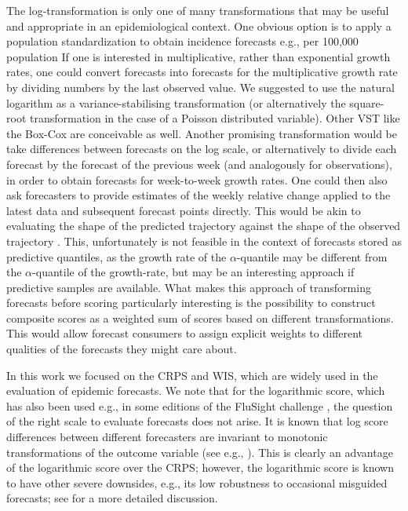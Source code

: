\documentclass{article}
\begin{document}
The log-transformation is only one of many transformations that may be useful and appropriate in an epidemiological context. One obvious option is to apply a population standardization to obtain incidence forecasts e.g., per 100,000 population If one is interested in multiplicative, rather than exponential growth rates, one could convert forecasts into forecasts for the multiplicative growth rate by dividing numbers by the last observed value. We suggested to use the natural logarithm as a variance-stabilising transformation (or alternatively the square-root transformation in the case of a Poisson distributed variable). Other VST like the Box-Cox \citep{boxAnalysisTransformations1964} are conceivable as well. Another promising transformation would be take differences between forecasts on the log scale, or alternatively
to divide each forecast by the forecast of the previous week (and analogously for observations), in order to obtain forecasts for week-to-week growth rates. One could then also ask forecasters to provide estimates of the weekly relative change applied to the latest data and subsequent forecast points directly. This would be akin to evaluating the shape of the predicted trajectory against the shape of the observed trajectory \citep[for a different approach to evaluate the shape of a forecast, see][]{srivastavaShapebasedEvaluationEpidemic2022}. This, unfortunately is not feasible in the context of forecasts stored as predictive quantiles, as the growth rate of the $\alpha$-quantile may be different from the $\alpha$-quantile of the growth-rate, but may be an interesting approach if predictive samples are available. What makes this approach of transforming forecasts before scoring particularly interesting is the possibility to construct composite scores as a weighted sum of scores based on different transformations. This would allow forecast consumers to assign explicit weights to different qualities of the forecasts they might care about.

In this work we focused on the CRPS and WIS, which are widely used in the evaluation of epidemic forecasts. We note that for the logarithmic score, which has also been used e.g., in some editions of the FluSight challenge \cite{reichCollaborativeMultiyearMultimodel2019}, the question of the right scale to evaluate forecasts does not arise. It is known that log score differences between different forecasters are invariant to monotonic transformations of the outcome variable (see e.g., \citealt{Diks2011}). This is clearly an advantage of the logarithmic score over the CRPS; however, the logarithmic score is known to have other severe downsides, e.g., its low robustness to occasional misguided forecasts; see \cite{bracherEvaluatingEpidemicForecasts2021} for a more detailed discussion.
\end{document}
